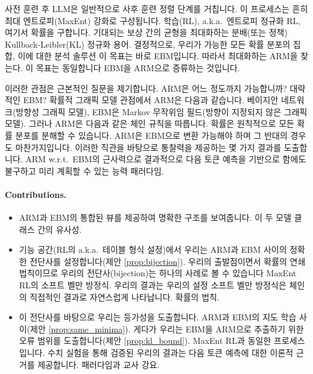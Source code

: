 \documentclass{article}
\def\aka{{a.k.a.\ }}
\def\wrt{{w.r.t.\ }}
\begin{document}
사전 훈련 후 LLM은 일반적으로 사후 훈련 정렬 단계를 거칩니다.
이 프로세스는 흔히 최대 엔트로피(MaxEnt) 강화로 구성됩니다.
학습(RL), \aka 엔트로피 정규화 RL, 여기서 확률을 구합니다.
기대되는 보상 간의 균형을 최대화하는 분배(또는 정책)
Kullback-Leibler(KL) 정규화 용어. 결정적으로, 우리가
가능한 모든 확률 분포의 집합, 이에 대한 분석 솔루션
이 목표는 바로 EBM입니다.
따라서 최대화하는 ARM을 찾는다.
이 목표는 동일합니다 
EBM을 ARM으로 증류하는 것입니다.

이러한 관점은 근본적인 질문을 제기합니다. ARM은 어느 정도까지 가능합니까?
대략적인 EBM?  확률적 그래픽 모델 관점에서 ARM은 다음과 같습니다.
베이지안 네트워크(방향성 그래픽 모델), EBM은 Markov 무작위임
필드(방향이 지정되지 않은 그래픽 모델).  그러나 ARM은 다음과 같은 체인 규칙을 따릅니다.
확률은 원칙적으로 모든 확률 분포를 분해할 수 있습니다.
ARM은 EBM으로 변환 가능해야 하며 그 반대의 경우도 마찬가지입니다.
이러한 직관을 바탕으로 통찰력을 제공하는 몇 가지 결과를 도출합니다.
ARM \wrt EBM의 근사력으로 결과적으로
다음 토큰 예측을 기반으로 함에도 불구하고 미리 계획할 수 있는 능력
패러다임.

\paragraph{Contributions.}

\begin{itemize}[topsep=0pt,itemsep=3pt,parsep=3pt,leftmargin=5pt]

\item ARM과 EBM의 통합된 뷰를 제공하여 명확한 구조를 보여줍니다.
    이 두 모델 클래스 간의 유사성.

\item 기능 공간(RL의 \aka 테이블 형식 설정)에서 우리는
    ARM과 EBM 사이의 정확한 전단사를 설정합니다(제안 \ref{prop:bijection}). 
    우리의 출발점이면서
    확률의 연쇄 법칙이므로 우리의 전단사(bijection)는 하나의 사례로 볼 수 있습니다
    MaxEnt RL의 소프트 벨만 방정식. 우리의 결과는
    우리의 설정
    소프트 벨만 방정식은 체인의 직접적인 결과로 자연스럽게 나타납니다.
    확률의 법칙.

\item 이 전단사를 바탕으로 우리는 등가성을 도출합니다.
    ARM과 EBM의 지도 학습 사이(제안 \ref{prop:same_minima}). 게다가 우리는
    EBM을 ARM으로 추출하기 위한 오류 범위를 도출합니다(제안 \ref{prop:kl_bound}). 
    MaxEnt RL과 동일한 프로세스입니다. 
    수치 실험을 통해 검증된 우리의 결과는
    다음 토큰 예측에 대한 이론적 근거를 제공합니다.
    패러다임과 교사 강요.

\end{itemize}
\end{document}
